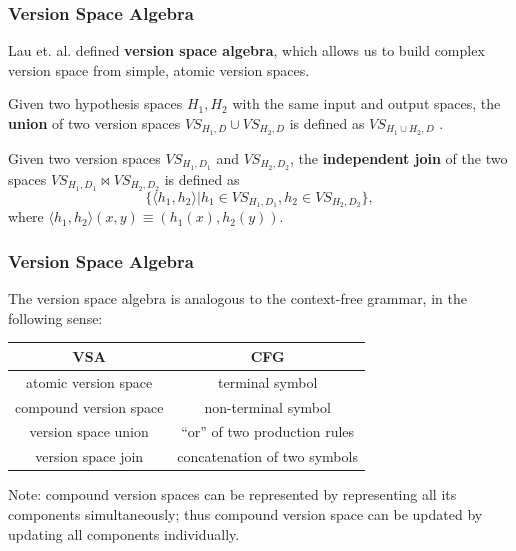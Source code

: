 \documentclass{beamer}
\begin{document}
\begin{frame}
\frametitle{Version Space Algebra}

Lau et. al. defined \textbf{version space algebra}, which allows us to build complex version space from simple, atomic version spaces.

\pause 

\begin{definition}
	Given two hypothesis spaces $H_1, H_2$ with the same input and output spaces, the \textbf{union} of two version spaces $VS_{H_1, D} \cup VS_{H_2, D}$ is defined as $VS_{H_1 \cup H_2, D}$ .
\end{definition}

\begin{definition}
	Given two version spaces $VS_{H_1, D_1}$ and $VS_{H_2, D_2}$, the \textbf{independent join} of the two spaces $VS_{H_1, D_1} \bowtie VS_{H_2, D_2}$ is defined as $$\{\langle h_1, h_2 \rangle| h_1 \in VS_{H_1, D_1}, h_2 \in VS_{H_2, D_2}\},$$
	where
	$ \langle h_1, h_2 \rangle (x, y) \equiv (h_1(x), h_2(y))$.
\end{definition}

\end{frame}

\begin{frame}
	\frametitle{Version Space Algebra}
	The version space algebra is analogous to the context-free grammar, in the following sense:
	\begin{table}[h]
		\centering
	\begin{tabular}{|c|c|}
		\hline 
		\textbf{VSA} & \textbf{CFG} \\ 
		\hline 
		atomic version space & terminal symbol \\ 
		compound version space & non-terminal symbol \\ 
		version space union & ``or'' of two production rules \\ 
		version space join & concatenation of two symbols \\ 
		\hline 
	\end{tabular} 
	\end{table}

	Note: compound version spaces can be represented by representing all its components simultaneously; thus compound version space can be updated by updating all components individually.
\end{frame}
\end{document}

